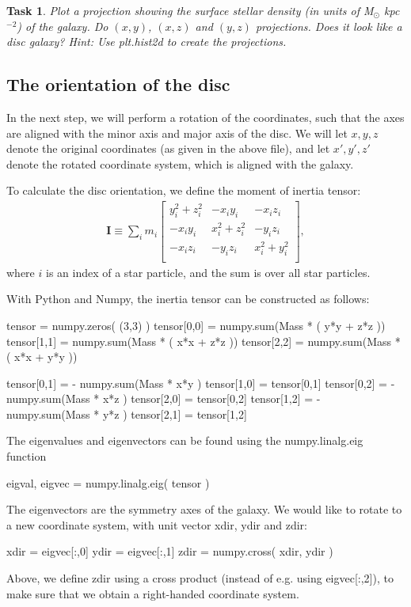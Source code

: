 \documentclass[11pt,a4paper]{article} %
\newtheorem{Exercise}{Task}
\newcommand{\bs}[1]{\boldsymbol{#1}}
\begin{document}
{\color{ForestGreen}
\begin{Exercise}Plot a projection showing the surface stellar density (in units of M$_{\odot}$ kpc$^{-2}$) of the galaxy. Do $(x,y)$, $(x,z)$ and $(y,z)$ projections. Does it look like a disc galaxy? Hint: Use plt.hist2d to create the projections.
\end{Exercise}
}

\subsection*{The orientation of the disc}

In the next step, we will perform a rotation of the coordinates, such that the axes are aligned with the minor axis and major axis of the disc. We will let $x,y,z$ denote the original coordinates (as given in the above file), and let $x',y',z'$ denote the rotated coordinate system, which is aligned with the galaxy.

To calculate the disc orientation, we define the moment of inertia tensor:
\begin{align}
\bs{I} \equiv \sum_i m_i \begin{bmatrix}
y_i^2+z_i^2 & -x_iy_i & -x_iz_i\\
-x_iy_i & x_i^2+z_i^2 & -y_iz_i\\
-x_iz_i & -y_iz_i & x_i^2+y_i^2\\
\end{bmatrix},
\end{align}
where $i$ is an index of a star particle, and the sum is over all star particles.

With Python and Numpy, the inertia tensor can be constructed as follows:
\begin{python}
tensor = numpy.zeros( (3,3) )
tensor[0,0] = numpy.sum(Mass * ( y*y + z*z ))
tensor[1,1] = numpy.sum(Mass * ( x*x + z*z ))
tensor[2,2] = numpy.sum(Mass * ( x*x + y*y ))

tensor[0,1] = - numpy.sum(Mass * x*y )
tensor[1,0] = tensor[0,1]
tensor[0,2] = - numpy.sum(Mass * x*z )
tensor[2,0] = tensor[0,2]
tensor[1,2] = - numpy.sum(Mass * y*z )
tensor[2,1] = tensor[1,2]
\end{python}
The eigenvalues and eigenvectors can be found using the {\ttm numpy.linalg.eig} function
\begin{python}
eigval, eigvec = numpy.linalg.eig( tensor )
\end{python}
The eigenvectors are the symmetry axes of the galaxy. We would like to rotate to a new coordinate system, with unit vector {\ttm xdir}, {\ttm ydir} and {\ttm zdir}:
\begin{python}
xdir = eigvec[:,0]
ydir = eigvec[:,1]
zdir = numpy.cross( xdir, ydir )
\end{python}
Above, we define {\ttm zdir} using a cross product (instead of e.g. using {\ttm eigvec[:,2]}), to make sure that we obtain a right-handed coordinate system.
\end{document}
